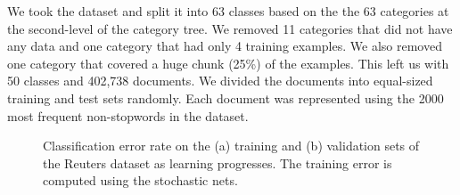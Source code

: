 \documentclass[12pt]{article}
\begin{document}
We took the dataset and split it into 63 classes based on the 
the 63 categories at the second-level of the category tree.
We removed 11 categories that did not have any data and one category that
had only 4 training examples. We also removed one category that covered a huge
chunk (25\%) of the examples. This left us with 50 classes and 402,738 documents.
We divided the documents into equal-sized training and test sets randomly. Each
document was represented using the 2000 most frequent non-stopwords in the dataset.

\begin{figure}[h]
\caption{Classification error rate on the (a) training and (b) validation sets of the Reuters dataset as learning progresses.
The training error is computed using the stochastic nets.}
\label{fig:reuters}
\end{figure}
\end{document}

